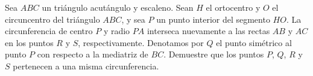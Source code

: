 Sea $ABC$ un triángulo acutángulo y escaleno. Sean $H$ el ortocentro y $O$ el circuncentro del triángulo $ABC$, y sea $P$ un punto interior del segmento $HO$. La circunferencia de centro $P$ y radio $PA$ interseca nuevamente a las rectas $AB$ y $AC$ en los puntos $R$ y $S$, respectivamente. Denotamos por $Q$ el punto simétrico al punto $P$ con respecto a la mediatriz de $BC$. Demuestre que los puntos $P$, $Q$, $R$ y $S$ pertenecen a una misma circunferencia.
